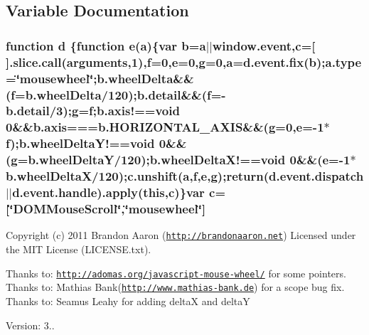 \subsection{Variable Documentation}
\hypertarget{jquery_8mousewheel-3_80_86_8pack_8js_a36541169dfff685f807208881a4f0021}{
\subsubsection[{d}]{\setlength{\rightskip}{0pt plus 5cm}function d \{function {\bf e}({\bf a})\{var {\bf b}={\bf a}$\vert$$\vert$window.\+event,{\bf c}=\mbox{[}$\,$\mbox{]}.slice.\+call(arguments,1),{\bf f}=0,{\bf e}=0,{\bf g}=0,{\bf a}=d.\+event.\+fix({\bf b});a.\+type=\char`\"{}mousewheel\char`\"{};b.\+wheel\+Delta\&\&({\bf f}=b.\+wheel\+Delta/120);b.\+detail\&\&({\bf f}=-\/b.\+detail/3);{\bf g}={\bf f};b.\+axis!==void 0\&\&b.\+axis===b.\+H\+O\+R\+I\+Z\+O\+N\+T\+A\+L\+\_\+\+A\+X\+I\+S\&\&({\bf g}=0,{\bf e}=-\/1$\ast${\bf f});b.\+wheel\+Delta\+Y!==void 0\&\&({\bf g}=b.\+wheel\+Delta\+Y/120);b.\+wheel\+Delta\+X!==void 0\&\&({\bf e}=-\/1$\ast$b.\+wheel\+Delta\+X/120);c.\+unshift({\bf a},{\bf f},{\bf e},{\bf g});return(d.\+event.\+dispatch$\vert$$\vert${\bf d.\+event.\+handle}).apply({\bf this},{\bf c})\}var {\bf c}=\mbox{[}\char`\"{}D\+O\+M\+Mouse\+Scroll\char`\"{},\char`\"{}{\bf mousewheel}\char`\"{}\mbox{]}}}\label{jquery_8mousewheel-3_80_86_8pack_8js_a36541169dfff685f807208881a4f0021}
Copyright (c) 2011 Brandon Aaron (\href{http://brandonaaron.net}{\tt http\+://brandonaaron.\+net}) Licensed under the M\+I\+T License (L\+I\+C\+E\+N\+S\+E.\+txt).

Thanks to\+: \href{http://adomas.org/javascript-mouse-wheel/}{\tt http\+://adomas.\+org/javascript-\/mouse-\/wheel/} for some pointers. Thanks to\+: Mathias Bank(\href{http://www.mathias-bank.de}{\tt http\+://www.\+mathias-\/bank.\+de}) for a scope bug fix. Thanks to\+: Seamus Leahy for adding delta\+X and delta\+Y

Version\+: 3..

